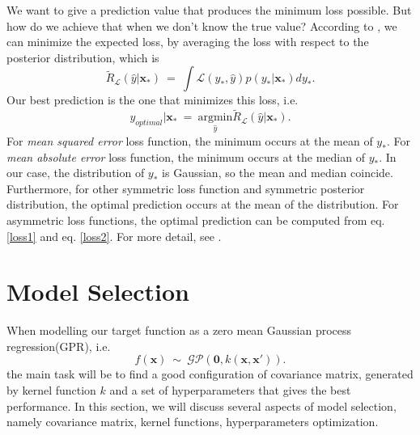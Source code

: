 \documentclass[12pt,a4paper]{article}
\theoremstyle{definition}
\newcommand{\GP}{\mathcal{GP}}
\numberwithin{equation}{section}
\let\vec\mathbf
\begin{document}
We want to give a prediction value that produces the minimum loss possible. But how do we achieve that when we don't know the true value? According to \cite[Rasmussen and Williams, sec 2.4]{RandW}, we can minimize the expected loss, by averaging the loss with respect to the posterior distribution, which is 
\begin{equation}\label{loss1}
\tilde{R}_{\mathcal{L}}(\hat y|\vec x_*)\ = \ \int\mathcal{L}(y_*,\hat y)p(y_*|\vec x_*)dy_*.
\end{equation}\label{loss2}
Our best prediction is the one that minimizes this loss, i.e.
\begin{equation}
y_{optimal}|\vec x_*\ = \ \underset{\hat y}{\mathrm{argmin}}\tilde{R}_{\mathcal{L}}(\hat y|\vec x_*).
\end{equation}
For \textit{mean squared error} loss function, the minimum occurs at the mean of $y_*$. For \textit{mean absolute error} loss function, the minimum occurs at the median of $y_*$. In our case, the distribution of $y_*$ is Gaussian, so the mean and median coincide. Furthermore, for other symmetric loss function and symmetric posterior distribution, the optimal prediction occurs at the mean of the distribution. For asymmetric loss functions, the optimal prediction can be computed from eq. \ref{loss1} and eq. \ref{loss2}. For more detail, see \cite[Berger]{Berger}.

\newpage
\section{Model Selection}
When modelling our target function as a zero mean Gaussian process regression(GPR), i.e.
\begin{equation*} \label{}
f(\vec x) \  \sim \ \GP\left(\vec 0,k(\vec{x},\vec{x'})  \right).
\end{equation*}
the main task will be to find a good configuration of covariance matrix, generated by kernel function $k$ and a set of hyperparameters that gives the best performance. In this section, we will discuss several aspects of model selection, namely covariance matrix, kernel functions, hyperparameters optimization.
\end{document}
